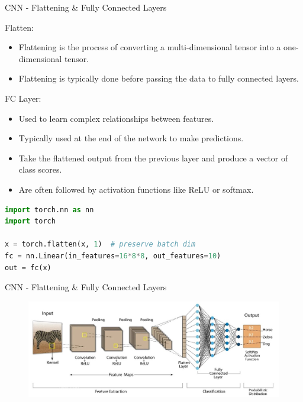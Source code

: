 \begin{frame}[fragile]{CNN - Flattening & Fully Connected Layers}
\begin{block}{Flatten:}
    \begin{itemize}
        \item Flattening is the process of converting a multi-dimensional tensor into a one-dimensional tensor.
        \item Flattening is typically done before passing the data to fully connected layers.
    \end{itemize}
\end{block}

\begin{block}{FC Layer:}
    \begin{itemize}
        \item Used to learn complex relationships between features.
        \item Typically used at the end of the network to make predictions.
        \item Take the flattened output from the previous layer and produce a vector of class scores.
        \item Are often followed by activation functions like ReLU or softmax.
    \end{itemize}
\end{block}

\begin{lstlisting}[language=Python, caption={Code snippet (PyTorch)}, basicstyle=\ttfamily\footnotesize]
import torch.nn as nn
import torch

x = torch.flatten(x, 1)  # preserve batch dim
fc = nn.Linear(in_features=16*8*8, out_features=10)
out = fc(x)
\end{lstlisting}
\end{frame}  

\begin{frame}{CNN - Flattening & Fully Connected Layers}
\begin{figure}
\centering
\includegraphics[width=1.0\textwidth,height=0.9\textheight,keepaspectratio]{images/cnn/cnn-fully-connected.jpeg}
\end{figure}
    
\end{frame}